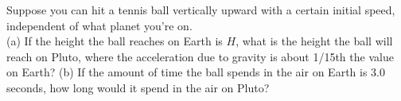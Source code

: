 Suppose you can hit a tennis ball vertically upward with a certain
initial speed, independent of what planet you're on.\\
(a) If the height the ball reaches on Earth is $H$, what is
the height the ball will reach on Pluto, where the
acceleration due to gravity is about 1/15th the value on Earth?\answercheck\hwendpart
(b) If the amount of time the ball spends in the air on Earth is 3.0
seconds, how long would it spend in the air on Pluto?\answercheck
